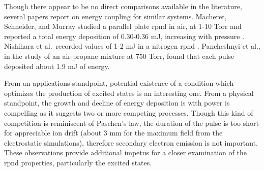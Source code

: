 Though there appear to be no direct comparisons available in the literature,
several papers report on energy coupling for similar systems. Macheret,
Schneider, and Murray studied a parallel plate \acs{rpnd} in air, at 1-10 Torr
and reported a total energy deposition of 0.30-0.36 mJ, increasing with pressure
\cite{Macheret2006}. Nishihara et al.\ recorded values of 1-2 mJ in a nitrogen
\acs{rpnd} \cite{Nishihara2006}. Pancheshnyi et al., in the study of an
air-propane mixture at 750 Torr, found that each pulse deposited about 1.9 mJ of
energy.

From an applications standpoint, potential existence of a condition which
optimizes the production of excited states is an interesting one. From a
physical standpoint, the growth and decline of energy deposition is with power
is compelling as it suggests two or more competing processes. Though this kind
of competition is reminiscent of Paschen's law, the duration of the pulse is too
short for appreciable ion drift (about 3 mm for the maximum field from the
electrostatic simulations), therefore secondary electron emission is not
important. These observations provide additional impetus for a closer
examination of the \acs{rpnd} properties, particularly the excited states.
